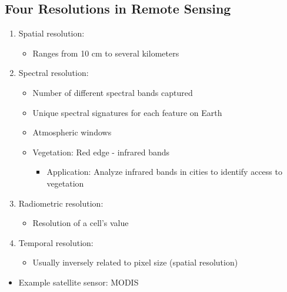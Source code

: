 \documentclass[
  letterpaper,
  DIV=11,
  numbers=noendperiod]{scrreprt}
\providecommand{\tightlist}{%
  \setlength{\itemsep}{0pt}\setlength{\parskip}{0pt}}\usepackage{longtable,booktabs,array}
\begin{document}
\hypertarget{four-resolutions-in-remote-sensing}{%
\subsection{Four Resolutions in Remote
Sensing}\label{four-resolutions-in-remote-sensing}}

\begin{enumerate}
\def\labelenumi{\arabic{enumi}.}
\tightlist
\item
  Spatial resolution:

  \begin{itemize}
  \tightlist
  \item
    Ranges from 10 cm to several kilometers
  \end{itemize}
\item
  Spectral resolution:

  \begin{itemize}
  \tightlist
  \item
    Number of different spectral bands captured
  \item
    Unique spectral signatures for each feature on Earth
  \item
    Atmospheric windows
  \item
    Vegetation: Red edge - infrared bands

    \begin{itemize}
    \tightlist
    \item
      Application: Analyze infrared bands in cities to identify access
      to vegetation
    \end{itemize}
  \end{itemize}
\item
  Radiometric resolution:

  \begin{itemize}
  \tightlist
  \item
    Resolution of a cell's value
  \end{itemize}
\item
  Temporal resolution:

  \begin{itemize}
  \tightlist
  \item
    Usually inversely related to pixel size (spatial resolution)
  \end{itemize}
\end{enumerate}

\begin{itemize}
\tightlist
\item
  Example satellite sensor: MODIS
\end{itemize}
\end{document}
